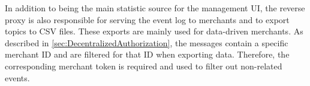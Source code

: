 In addition to being the main statistic source for the management UI, the reverse proxy is also responsible for serving the event log to merchants and to export topics to CSV files. These exports are mainly used for data-driven merchants. As described in \cref{sec:DecentralizedAuthorization}, the messages contain a specific merchant ID and are filtered for that ID when exporting data. Therefore, the corresponding merchant token is required and used to filter out non-related events.


%
%

